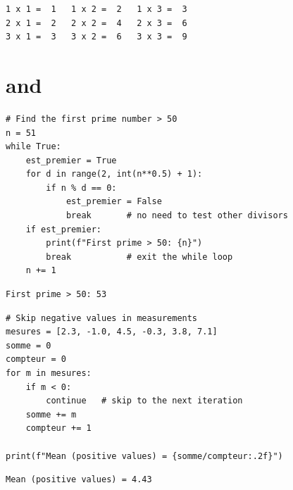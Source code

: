 \begin{codeoutput}
\begin{verbatim}
1 x 1 =  1   1 x 2 =  2   1 x 3 =  3
2 x 1 =  2   2 x 2 =  4   2 x 3 =  6
3 x 1 =  3   3 x 2 =  6   3 x 3 =  9
\end{verbatim}
\end{codeoutput}

\section{ and }

\begin{codeblock}[title=\textbf{Python}]
\begin{verbatim}
# Find the first prime number > 50
n = 51
while True:
    est_premier = True
    for d in range(2, int(n**0.5) + 1):
        if n % d == 0:
            est_premier = False
            break       # no need to test other divisors
    if est_premier:
        print(f"First prime > 50: {n}")
        break           # exit the while loop
    n += 1
\end{verbatim}
\end{codeblock}

\begin{codeoutput}
\begin{verbatim}
First prime > 50: 53
\end{verbatim}
\end{codeoutput}

\begin{codeblock}[title=\textbf{Python}]
\begin{verbatim}
# Skip negative values in measurements
mesures = [2.3, -1.0, 4.5, -0.3, 3.8, 7.1]
somme = 0
compteur = 0
for m in mesures:
    if m < 0:
        continue   # skip to the next iteration
    somme += m
    compteur += 1

print(f"Mean (positive values) = {somme/compteur:.2f}")
\end{verbatim}
\end{codeblock}

\begin{codeoutput}
\begin{verbatim}
Mean (positive values) = 4.43
\end{verbatim}
\end{codeoutput}

